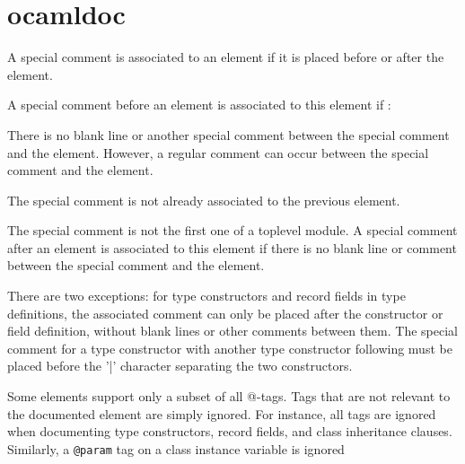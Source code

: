 
\section{ocamldoc}
\label{sec:ocamldoc}



A special comment is associated to an element if it is placed before
or after the element.


A special comment before an element is associated to this element if :


There is no blank line or another special comment between the special
comment and the element. However, a regular comment can occur between
the special comment and the element.


The special comment is not already associated to the previous element.


The special comment is not the first one of a toplevel module.
A special comment after an element is associated to this element if
there is no blank line or comment between the special comment and the
element.

There are two exceptions: for type constructors and record fields in
type definitions, the associated comment can only be placed after the
constructor or field definition, without blank lines or other comments
between them. The special comment for a type constructor with another
type constructor following must be placed before the '|' character
separating the two constructors.



Some elements support only a subset of all @-tags. Tags that are not
relevant to the documented element are simply ignored. For instance,
all tags are ignored when documenting type constructors, record
fields, and class inheritance clauses. Similarly, a \verb|@param| tag on a
class instance variable is ignored

